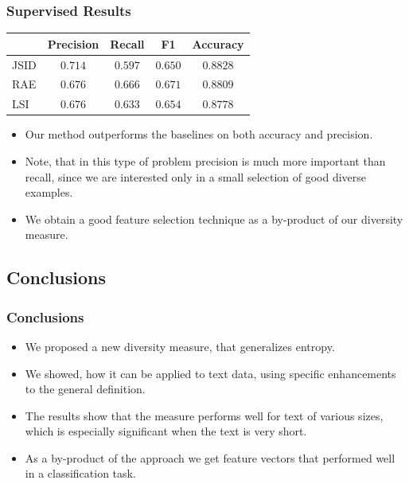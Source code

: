 \documentclass{beamer}
\begin{document}
\begin{frame}
\frametitle{Supervised Results}
\begin{table}[t]
\label{tab:classification-results}
\vspace{-4mm}
\begin{center}
\begin{tabular}{|l|c|c|c|c|}
\hline
&Precision & Recall & F1 & Accuracy
\\ \hline 
JSID         &$\mathbf{0.714}$&$0.597$&$0.650$& $\mathbf{0.8828}$\\
RAE             &$0.676$&$\mathbf{0.666}$&$\mathbf{0.671}$&$0.8809$ \\
LSI             &$0.676$&$0.633$&$0.654$&$0.8778$\\
\hline
\end{tabular}
\end{center}
\end{table}
\begin{itemize}
\item Our method outperforms the baselines on both accuracy and
  precision.
\item Note, that in this type of problem precision is much more
  important than recall, since we are interested only in a small
  selection of good diverse examples.
\item We obtain a good feature selection technique as a by-product
  of our diversity measure.
\end{itemize}
\end{frame}

\subsection{Conclusions}

\begin{frame}
\frametitle{Conclusions}
\begin{itemize}
\item We proposed a new diversity measure, that generalizes entropy.
\item We showed, how it can be applied to text data, using specific
  enhancements to the general definition.
\item The results show that the measure performs well for text of
  various sizes, which is especially significant when the text is very
  short.
\item As a by-product of the approach we get feature vectors that
  performed well in a classification task.
\end{itemize}
\end{frame}
\end{document}
